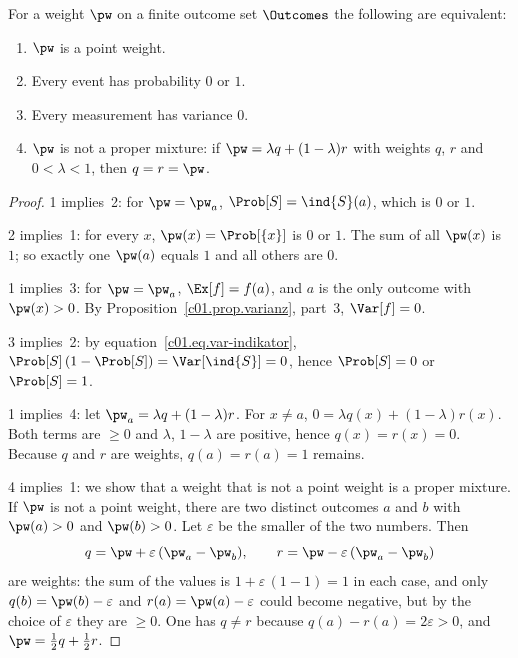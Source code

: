 \begin{proposition}\label{c01.prop.punktgewicht}
  For a weight $\pw$ on a finite outcome set $\Outcomes$ the following are equivalent:
  \begin{enumerate}
    \item $\pw$ is a point weight.
    \item Every event has probability $0$ or $1$.
    \item Every measurement has variance $0$.
    \item $\pw$ is not a proper mixture: if $\pw = \lambda q + (1 - \lambda) r$ with
      weights $q$, $r$ and $0 < \lambda < 1$, then $q = r = \pw$.
  \end{enumerate}
\end{proposition}
\begin{proof}
  1 implies~2: for $\pw = \pw_a$, $\Prob[S] = \ind{S}(a)$, which is $0$ or $1$.

  2 implies~1: for every $x$, $\pw(x) = \Prob[\{x\}]$ is $0$ or $1$. The sum
  of all $\pw(x)$ is $1$; so exactly one $\pw(a)$ equals $1$ and all others are $0$.

  1 implies~3: for $\pw = \pw_a$, $\Ex[f] = f(a)$, and $a$ is the only outcome
  with $\pw(x) > 0$. By Proposition~\ref{c01.prop.varianz}, part~3, $\Var[f] = 0$.

  3 implies~2: by equation~\eqref{c01.eq.var-indikator},
  $\Prob[S]\,(1 - \Prob[S]) = \Var[\ind{S}] = 0$, hence $\Prob[S] = 0$ or $\Prob[S] = 1$.

  1 implies~4: let $\pw_a = \lambda q + (1 - \lambda) r$. For $x \neq a$,
  $0 = \lambda q(x) + (1 - \lambda) r(x)$. Both terms are $\geq 0$ and
  $\lambda$, $1 - \lambda$ are positive, hence $q(x) = r(x) = 0$. Because $q$ and $r$
  are weights, $q(a) = r(a) = 1$ remains.

  4 implies~1: we show that a weight that is not a point weight is a proper
  mixture. If $\pw$ is not a point weight, there are two distinct outcomes $a$
  and $b$ with $\pw(a) > 0$ and $\pw(b) > 0$. Let $\varepsilon$ be the smaller of the two
  numbers. Then
  \begin{equation}\label{c01.eq.echte-mischung}
    q = \pw + \varepsilon\,(\pw_a - \pw_b),
    \qquad
    r = \pw - \varepsilon\,(\pw_a - \pw_b)
  \end{equation}
  are weights: the sum of the values is $1 + \varepsilon\,(1 - 1) = 1$ in each case, and
  only $q(b) = \pw(b) - \varepsilon$ and $r(a) = \pw(a) - \varepsilon$ could become
  negative, but by the choice of $\varepsilon$ they are $\geq 0$. One has $q \neq r$ because
  $q(a) - r(a) = 2\varepsilon > 0$, and $\pw = \tfrac12 q + \tfrac12 r$.
\end{proof}

